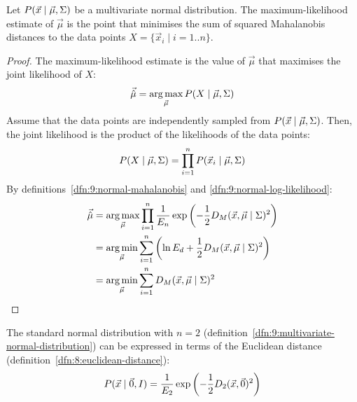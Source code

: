 \begin{thm}
  Let $P(\vec{x} \mid \vec{\mu}, \Sigma)$ be a multivariate normal
  distribution.
  The maximum-likelihood estimate of $\vec{\mu}$ is the point that minimises
  the sum of squared Mahalanobis distances to the data points
  $X = \{ \vec{x}_i \mid i = 1 .. n \}$.

  \begin{proof}
    The maximum-likelihood estimate is the value of $\vec{\mu}$ that maximises
    the joint likelihood of $X$:
    \begin{equation}
      \vec{\hat{\mu}} = \operatorname*{arg\,max}_{\vec{\mu}} P(X \mid \vec{\mu}, \Sigma)
    \end{equation}
    Assume that the data points are independently sampled from
    $P(\vec{x} \mid \vec{\mu}, \Sigma)$.
    Then, the joint likelihood is the product of the likelihoods of the data
    points:
    \begin{equation}
      P(X \mid \vec{\mu}, \Sigma)
      = \prod_{i = 1}^n P(\vec{x}_i \mid \vec{\mu}, \Sigma)
    \end{equation}
    By definitions~\ref{dfn:9:normal-mahalanobis} and
    \ref{dfn:9:normal-log-likelihood}:
    \begin{align}
      \vec{\hat{\mu}}
       & = \operatorname*{arg\,max}_{\vec{\mu}}
      \prod_{i = 1}^n
      \frac{1}{E_n}
      \exp \left( -\frac{1}{2} D_M (\vec{x}, \vec{\mu} \mid \Sigma)^2 \right)        \\
       & = \operatorname*{arg\,min}_{\vec{\mu}}
      \sum_{i = 1}^n
      \left( \ln E_d + \frac{1}{2} D_M (\vec{x}, \vec{\mu} \mid \Sigma)^2 \right)    \\
       & = \operatorname*{arg\,min}_{\vec{\mu}} \sum_{i = 1}^n D_M (\vec{x}, \vec{\mu} \mid \Sigma)^2
    \end{align}
  \end{proof}
\end{thm}

\begin{dfn}
  \label{dfn:9:normal-euclidean}
  The standard normal distribution with $n = 2$
  (definition~\ref{dfn:9:multivariate-normal-distribution})
  can be expressed in terms of the Euclidean distance
  (definition~\ref{dfn:8:euclidean-distance}):
  \begin{equation}
    P(\vec{x} \mid \vec{0}, I)
    = \frac{1}{E_2} \exp\left( - \frac{1}{2} D_2 (\vec{x}, \vec{0})^2 \right)
  \end{equation}
\end{dfn}


